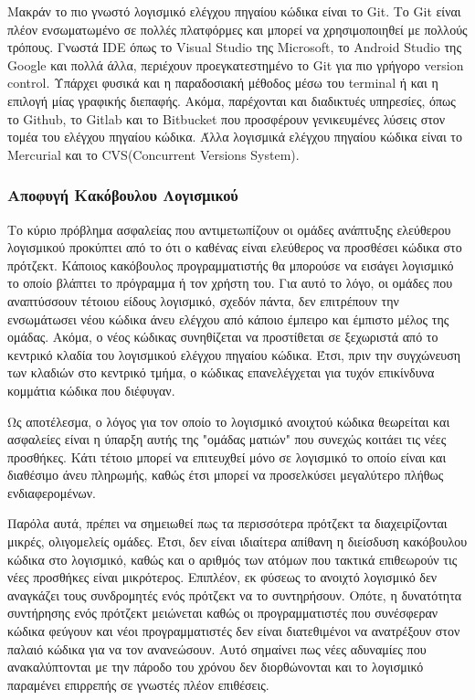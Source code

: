 \documentclass[a4paper, 11pt]{article}
\begin{document}
{{Μακράν το πιο γνωστό λογισμικό ελέγχου πηγαίου κώδικα είναι το \textlatin{Git}. Το \textlatin{Git} είναι πλέον ενσωματωμένο σε πολλές πλατφόρμες και μπορεί να χρησιμοποιηθεί με πολλούς τρόπους. Γνωστά \textlatin{IDE} όπως το \textlatin{Visual Studio} της \textlatin{Microsoft}, το \textlatin{Android Studio} της \textlatin{Google} και πολλά άλλα, περιέχουν προεγκατεστημένο το \textlatin{Git} για πιο γρήγορο \textlatin{version control}. Υπάρχει φυσικά και η παραδοσιακή μέθοδος μέσω του \textlatin{terminal} ή και η επιλογή μίας γραφικής διεπαφής. Ακόμα, παρέχονται και διαδικτυές υπηρεσίες, όπως το \textlatin{Github}, το \textlatin{Gitlab} και το \textlatin{Bitbucket} που προσφέρουν γενικευμένες λύσεις στον τομέα του ελέγχου πηγαίου κώδικα. Άλλα λογισμικά ελέγχου πηγαίου κώδικα είναι το \textlatin{Mercurial} και το \textlatin{CVS(Concurrent Versions System)}.

\subsubsection{Αποφυγή Κακόβουλου Λογισμικού}

Το κύριο πρόβλημα ασφαλείας που αντιμετωπίζουν οι ομάδες ανάπτυξης ελεύθερου λογισμικού προκύπτει από το ότι ο καθένας είναι ελεύθερος να προσθέσει κώδικα στο πρότζεκτ. Κάποιος κακόβουλος προγραμματιστής θα μπορούσε να εισάγει λογισμικό το οποίο βλάπτει το πρόγραμμα ή τον χρήστη του. Για αυτό το λόγο, οι ομάδες που αναπτύσσουν τέτοιου είδους λογισμικό, σχεδόν πάντα, δεν επιτρέπουν την ενσωμάτωσει νέου κώδικα άνευ ελέγχου από κάποιο έμπειρο και έμπιστο μέλος της ομάδας. Ακόμα, ο νέος κώδικας συνηθίζεται να προστίθεται σε ξεχωριστά από το κεντρικό κλαδία του λογισμικού ελέγχου πηγαίου κώδικα. Έτσι, πριν την συγχώνευση των κλαδιών στο κεντρικό τμήμα, ο κώδικας επανελέγχεται για τυχόν επικίνδυνα κομμάτια κώδικα που διέφυγαν.

Ως αποτέλεσμα, ο λόγος για τον οποίο το λογισμικό ανοιχτού κώδικα θεωρείται και ασφαλείες είναι η ύπαρξη αυτής της "ομάδας ματιών" που συνεχώς κοιτάει τις νέες προσθήκες. Κάτι τέτοιο μπορεί να επιτευχθεί μόνο σε λογισμικό το οποίο είναι και διαθέσιμο άνευ πληρωμής, καθώς έτσι μπορεί να προσελκύσει μεγαλύτερο πλήθως ενδιαφερομένων.

Παρόλα αυτά, πρέπει να σημειωθεί πως τα περισσότερα πρότζεκτ τα διαχειρίζονται μικρές, ολιγομελείς ομάδες. Έτσι, δεν είναι ιδιαίτερα απίθανη η διείσδυση κακόβουλου κώδικα στο λογισμικό, καθώς και ο αριθμός των ατόμων που τακτικά επιθεωρούν τις νέες προσθήκες είναι μικρότερος. Επιπλέον, εκ φύσεως το ανοιχτό λογισμικό δεν αναγκάζει τους συνδρομητές ενός πρότζεκτ να το συντηρήσουν. Οπότε, η δυνατότητα συντήρησης ενός πρότζεκτ μειώνεται καθώς οι προγραμματιστές που συνέσφεραν κώδικα φεύγουν και νέοι προγραμματιστές δεν είναι διατεθιμένοι να ανατρέξουν στον παλαιό κώδικα για να τον ανανεώσουν. Αυτό σημαίνει πως νέες αδυναμίες που ανακαλύπτονται με την πάροδο του χρόνου δεν διορθώνονται και το λογισμικό παραμένει επιρρεπής σε γνωστές πλέον επιθέσεις.

}}
\end{document}
